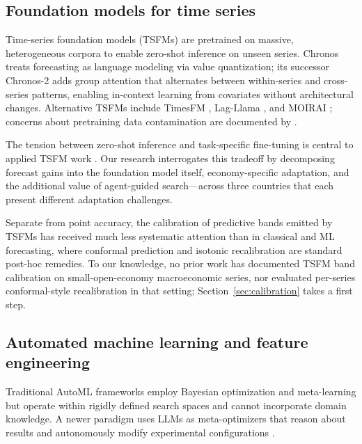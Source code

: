 \documentclass[12pt,a4paper]{article}
\begin{document}
\subsection{Foundation models for time series}
\label{sec:lit_tsfm}

Time-series foundation models (TSFMs) are pretrained on massive, heterogeneous corpora to enable zero-shot inference on unseen series. Chronos \citep{ansari2024chronos} treats forecasting as language modeling via value quantization; its successor Chronos-2 \citep{ansari2025chronos2} adds group attention that alternates between within-series and cross-series patterns, enabling in-context learning from covariates without architectural changes. Alternative TSFMs include TimesFM \citep{das2024decoder,das2025incontext}, Lag-Llama \citep{rasul2023lagllama}, and MOIRAI \citep{woo2024unified,liu2025moirai2}; concerns about pretraining data contamination are documented by \citet{aksu2024benchmarking}.

The tension between zero-shot inference and task-specific fine-tuning is central to applied TSFM work \citep{rasul2023lagllama}. Our research interrogates this tradeoff by decomposing forecast gains into the foundation model itself, economy-specific adaptation, and the additional value of agent-guided search---across three countries that each present different adaptation challenges.

Separate from point accuracy, the calibration of predictive bands emitted by TSFMs has received much less systematic attention than in classical and ML forecasting, where conformal prediction \citep{romano2019conformalized,angelopoulos2023conformal} and isotonic recalibration \citep{kuleshov2018accurate} are standard post-hoc remedies. To our knowledge, no prior work has documented TSFM band calibration on small-open-economy macroeconomic series, nor evaluated per-series conformal-style recalibration in that setting; Section~\ref{sec:calibration} takes a first step.

\subsection{Automated machine learning and feature engineering}
\label{sec:lit_automl}

Traditional AutoML frameworks \citep{feurer2015automl,erickson2020autogluon,shchur2023autogluon} employ Bayesian optimization and meta-learning but operate within rigidly defined search spaces and cannot incorporate domain knowledge. A newer paradigm uses LLMs as meta-optimizers that reason about results and autonomously modify experimental configurations \citep{lu2024aiscientist,yamada2025ai,cheng2026agentic,dong2025dataforge}.
\end{document}
